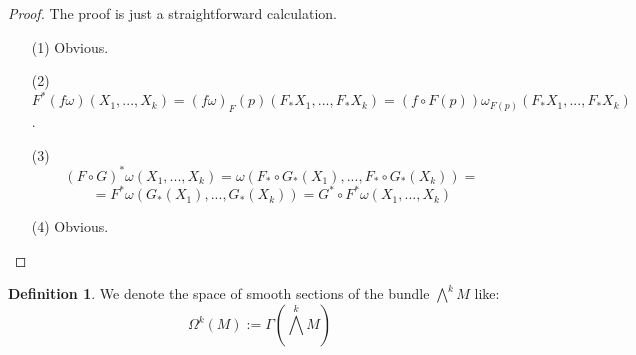 \documentclass[12pt,a4paper]{report}
\theoremstyle{definition}
\newtheorem{Def}{Definition}[chapter]
\theoremstyle{Theorem}
\theoremstyle{break}
\theoremstyle{definition}
\begin{document}
		\begin{proof}
			The proof is just a straightforward calculation.
			\begin{itemize}
				\item[(1)] Obvious.
				\item[(2)]  $F^*(f\omega)(X_1,...,X_k)=(f\omega)_F(p)(F_*X_1,...,F_*X_k)=(f\circ F(p))\omega_{F(p)}(F_*X_1,...,F_*X_k)$.
				\item[(3)] $$(F\circ G)^*\omega(X_1,...,X_k)=\omega(F_*\circ G_*(X_1),...,F_*\circ G_*(X_k))=$$$$=F^*\omega(G_*(X_1),..., G_*(X_k))=G^*\circ F^*\omega(X_1,...,X_k)$$
				\item[(4)] Obvious.
			\end{itemize}
		\end{proof}
		\begin{Def}
			We denote the space of smooth sections of the bundle $\bigwedge^k M$ like:
			$$\Omega^k(M):=\Gamma(\bigwedge^k M)$$
		\end{Def}
\end{document}
